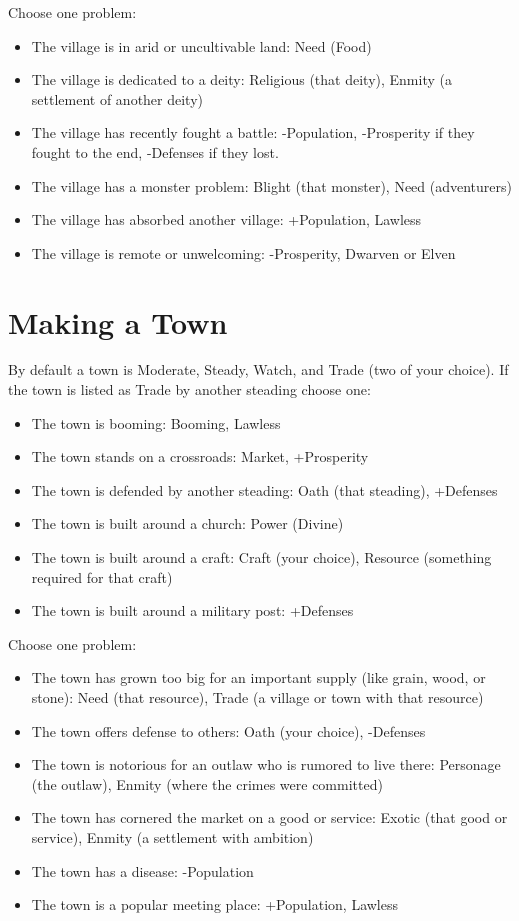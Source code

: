  Choose one problem:
\begin{itemize}
\item The village is in arid or uncultivable land: Need (Food)
\item The village is dedicated to a deity: Religious (that deity), Enmity (a settlement of another deity)
\item The village has recently fought a battle: -Population, -Prosperity if they fought to the end, -Defenses if they lost.
\item The village has a monster problem: Blight (that monster), Need (adventurers)
\item The village has absorbed another village: +Population, Lawless
\item The village is remote or unwelcoming: -Prosperity, Dwarven or Elven

\end{itemize}
\section{Making a Town}


 By default a town is Moderate, Steady, Watch, and Trade (two of your choice). If the town is listed as Trade by another steading choose one:
\begin{itemize}
\item The town is booming: Booming, Lawless
\item The town stands on a crossroads: Market, +Prosperity
\item The town is defended by another steading: Oath (that steading), +Defenses
\item The town is built around a church: Power (Divine)
\item The town is built around a craft: Craft (your choice), Resource (something required for that craft)
\item The town is built around a military post: +Defenses

\end{itemize}


 Choose one problem:
\begin{itemize}
\item The town has grown too big for an important supply (like grain, wood, or stone): Need (that resource), Trade (a village or town with that resource)
\item The town offers defense to others: Oath (your choice), -Defenses
\item The town is notorious for an outlaw who is rumored to live there: Personage (the outlaw), Enmity (where the crimes were committed)
\item The town has cornered the market on a good or service: Exotic (that good or service), Enmity (a settlement with ambition)
\item The town has a disease: -Population
\item The town is a popular meeting place: +Population, Lawless

\end{itemize}
